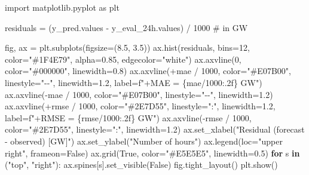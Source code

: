 \documentclass[
  english,
  letterpaper,
]{scrbook}
\newenvironment{Shaded}{\begin{snugshade}}{\end{snugshade}}
\newcommand{\CommentTok}[1]{\textcolor[rgb]{0.37,0.37,0.37}{#1}}
\newcommand{\ControlFlowTok}[1]{\textcolor[rgb]{0.00,0.23,0.31}{\textbf{#1}}}
\newcommand{\DecValTok}[1]{\textcolor[rgb]{0.68,0.00,0.00}{#1}}
\newcommand{\FloatTok}[1]{\textcolor[rgb]{0.68,0.00,0.00}{#1}}
\newcommand{\ImportTok}[1]{\textcolor[rgb]{0.00,0.46,0.62}{#1}}
\newcommand{\KeywordTok}[1]{\textcolor[rgb]{0.00,0.23,0.31}{\textbf{#1}}}
\newcommand{\NormalTok}[1]{\textcolor[rgb]{0.00,0.23,0.31}{#1}}
\newcommand{\OperatorTok}[1]{\textcolor[rgb]{0.37,0.37,0.37}{#1}}
\newcommand{\SpecialCharTok}[1]{\textcolor[rgb]{0.37,0.37,0.37}{#1}}
\newcommand{\SpecialStringTok}[1]{\textcolor[rgb]{0.13,0.47,0.30}{#1}}
\newcommand{\StringTok}[1]{\textcolor[rgb]{0.13,0.47,0.30}{#1}}
\newcommand{\VariableTok}[1]{\textcolor[rgb]{0.07,0.07,0.07}{#1}}
\begin{document}
\begin{Shaded}
\begin{Highlighting}[]
\ImportTok{import}\NormalTok{ matplotlib.pyplot }\ImportTok{as}\NormalTok{ plt}

\NormalTok{residuals }\OperatorTok{=}\NormalTok{ (y\_pred.values }\OperatorTok{{-}}\NormalTok{ y\_eval\_24h.values) }\OperatorTok{/} \DecValTok{1000}  \CommentTok{\# in GW}

\NormalTok{fig, ax }\OperatorTok{=}\NormalTok{ plt.subplots(figsize}\OperatorTok{=}\NormalTok{(}\FloatTok{8.5}\NormalTok{, }\FloatTok{3.5}\NormalTok{))}
\NormalTok{ax.hist(residuals, bins}\OperatorTok{=}\DecValTok{12}\NormalTok{, color}\OperatorTok{=}\StringTok{"\#1F4E79"}\NormalTok{, alpha}\OperatorTok{=}\FloatTok{0.85}\NormalTok{, edgecolor}\OperatorTok{=}\StringTok{"white"}\NormalTok{)}
\NormalTok{ax.axvline(}\DecValTok{0}\NormalTok{, color}\OperatorTok{=}\StringTok{"\#000000"}\NormalTok{, linewidth}\OperatorTok{=}\FloatTok{0.8}\NormalTok{)}
\NormalTok{ax.axvline(}\OperatorTok{+}\NormalTok{mae }\OperatorTok{/} \DecValTok{1000}\NormalTok{, color}\OperatorTok{=}\StringTok{"\#E07B00"}\NormalTok{, linestyle}\OperatorTok{=}\StringTok{"{-}{-}"}\NormalTok{, linewidth}\OperatorTok{=}\FloatTok{1.2}\NormalTok{, label}\OperatorTok{=}\SpecialStringTok{f"+MAE = }\SpecialCharTok{\{}\NormalTok{mae}\OperatorTok{/}\DecValTok{1000}\SpecialCharTok{:.2f\}}\SpecialStringTok{ GW"}\NormalTok{)}
\NormalTok{ax.axvline(}\OperatorTok{{-}}\NormalTok{mae }\OperatorTok{/} \DecValTok{1000}\NormalTok{, color}\OperatorTok{=}\StringTok{"\#E07B00"}\NormalTok{, linestyle}\OperatorTok{=}\StringTok{"{-}{-}"}\NormalTok{, linewidth}\OperatorTok{=}\FloatTok{1.2}\NormalTok{)}
\NormalTok{ax.axvline(}\OperatorTok{+}\NormalTok{rmse }\OperatorTok{/} \DecValTok{1000}\NormalTok{, color}\OperatorTok{=}\StringTok{"\#2E7D55"}\NormalTok{, linestyle}\OperatorTok{=}\StringTok{":"}\NormalTok{, linewidth}\OperatorTok{=}\FloatTok{1.2}\NormalTok{, label}\OperatorTok{=}\SpecialStringTok{f"+RMSE = }\SpecialCharTok{\{}\NormalTok{rmse}\OperatorTok{/}\DecValTok{1000}\SpecialCharTok{:.2f\}}\SpecialStringTok{ GW"}\NormalTok{)}
\NormalTok{ax.axvline(}\OperatorTok{{-}}\NormalTok{rmse }\OperatorTok{/} \DecValTok{1000}\NormalTok{, color}\OperatorTok{=}\StringTok{"\#2E7D55"}\NormalTok{, linestyle}\OperatorTok{=}\StringTok{":"}\NormalTok{, linewidth}\OperatorTok{=}\FloatTok{1.2}\NormalTok{)}
\NormalTok{ax.set\_xlabel(}\StringTok{"Residual (forecast {-} observed) [GW]"}\NormalTok{)}
\NormalTok{ax.set\_ylabel(}\StringTok{"Number of hours"}\NormalTok{)}
\NormalTok{ax.legend(loc}\OperatorTok{=}\StringTok{"upper right"}\NormalTok{, frameon}\OperatorTok{=}\VariableTok{False}\NormalTok{)}
\NormalTok{ax.grid(}\VariableTok{True}\NormalTok{, color}\OperatorTok{=}\StringTok{"\#E5E5E5"}\NormalTok{, linewidth}\OperatorTok{=}\FloatTok{0.5}\NormalTok{)}
\ControlFlowTok{for}\NormalTok{ s }\KeywordTok{in}\NormalTok{ (}\StringTok{"top"}\NormalTok{, }\StringTok{"right"}\NormalTok{):}
\NormalTok{    ax.spines[s].set\_visible(}\VariableTok{False}\NormalTok{)}
\NormalTok{fig.tight\_layout()}
\NormalTok{plt.show()}
\end{Highlighting}
\end{Shaded}
\end{document}
